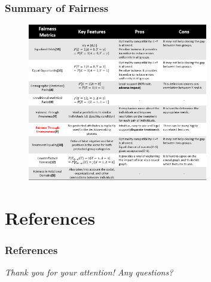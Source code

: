 \documentclass{beamer}
\begin{document}
\begin{frame}
\frametitle{Summary of Fairness}

\begin{figure}[hbt]
  \includegraphics[width=0.7\textwidth]{table.png}
\end{figure}
\end{frame}


\section{References}


\begin{frame}[allowframebreaks]
\frametitle{References}
\nocite{*}
\printbibliography
\end{frame}


\begin{frame}{}
  \centering \Large
  \emph{Thank you for your attention! Any questions?}
\end{frame}

\end{document}
